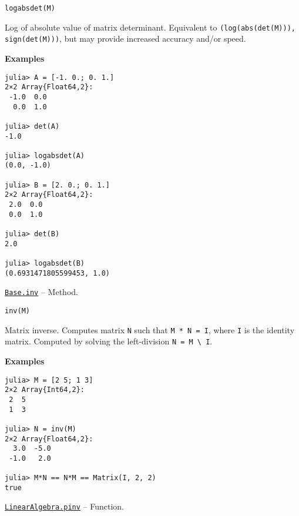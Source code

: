 \begin{adjustwidth}{2em}{0pt}


\begin{verbatim}
logabsdet(M)
\end{verbatim}

Log of absolute value of matrix determinant. Equivalent to \texttt{(log(abs(det(M))), sign(det(M)))}, but may provide increased accuracy and/or speed.

\textbf{Examples}


\begin{verbatim}
julia> A = [-1. 0.; 0. 1.]
2×2 Array{Float64,2}:
 -1.0  0.0
  0.0  1.0

julia> det(A)
-1.0

julia> logabsdet(A)
(0.0, -1.0)

julia> B = [2. 0.; 0. 1.]
2×2 Array{Float64,2}:
 2.0  0.0
 0.0  1.0

julia> det(B)
2.0

julia> logabsdet(B)
(0.6931471805599453, 1.0)
\end{verbatim}



\end{adjustwidth}
\hypertarget{3073938155232622368}{} 
\hyperlink{3073938155232622368}{\texttt{Base.inv}}  -- {Method.}

\begin{adjustwidth}{2em}{0pt}


\begin{verbatim}
inv(M)
\end{verbatim}

Matrix inverse. Computes matrix \texttt{N} such that \texttt{M * N = I}, where \texttt{I} is the identity matrix. Computed by solving the left-division \texttt{N = M {\textbackslash} I}.

\textbf{Examples}


\begin{verbatim}
julia> M = [2 5; 1 3]
2×2 Array{Int64,2}:
 2  5
 1  3

julia> N = inv(M)
2×2 Array{Float64,2}:
  3.0  -5.0
 -1.0   2.0

julia> M*N == N*M == Matrix(I, 2, 2)
true
\end{verbatim}



\end{adjustwidth}
\hypertarget{15549768004641518126}{} 
\hyperlink{15549768004641518126}{\texttt{LinearAlgebra.pinv}}  -- {Function.}

